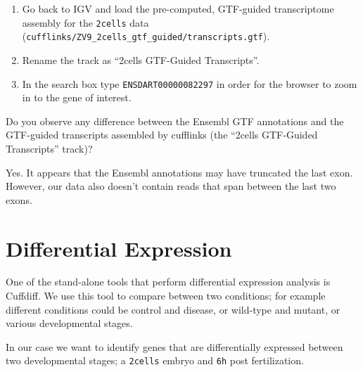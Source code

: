 \begin{steps}
\begin{enumerate}
  \item Go back to IGV and load the pre-computed, GTF-guided transcriptome
  assembly for the \texttt{2cells} data
  (\texttt{cufflinks/ZV9\_2cells\_gtf\_guided/transcripts.gtf}).
  \item Rename the track as ``2cells GTF-Guided Transcripts''.
  \item In the search box type \texttt{ENSDART00000082297} in order for the
  browser to zoom in to the gene of interest.
\end{enumerate}
\end{steps}

\begin{questions}
Do you observe any difference between the Ensembl GTF annotations and the
GTF-guided transcripts assembled by cufflinks (the ``2cells GTF-Guided Transcripts'' track)?
\begin{answer}
Yes. It appears that the Ensembl annotations may have truncated the last exon.
However, our data also doesn't contain reads that span between the last two
exons.
\end{answer}

\end{questions}

\section{Differential Expression}
One of the stand-alone tools that perform differential expression analysis is
Cuffdiff. We use this tool to compare between two conditions; for example
different conditions could be control and disease, or wild-type and mutant, or
various developmental stages.

In our case we want to identify genes that are
differentially expressed between two developmental stages; a \texttt{2cells}
embryo and \texttt{6h} post fertilization.


